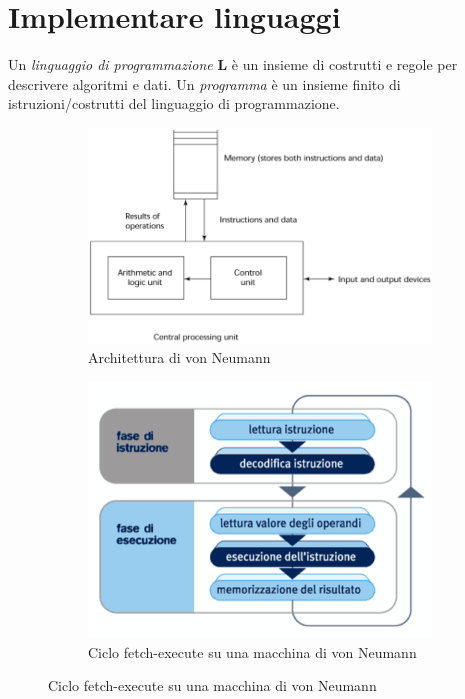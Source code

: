\documentclass[a4paper,oneside,titlepage]{book}
\begin{document}
\section{Implementare linguaggi}
Un \textit{linguaggio di programmazione} \textbf{L} è un insieme di costrutti e regole per descrivere algoritmi e dati. Un \textit{programma} è un insieme finito di istruzioni/costrutti del linguaggio di programmazione.
\begin{figure}[htp]
	\begin{subfigure}{0.49\textwidth}
		\includegraphics[width=\textwidth, height=\textheight, keepaspectratio]{vn1.png} 
		\caption{Architettura di von Neumann}
	\end{subfigure}
	\hfill
	\begin{subfigure}{0.49\textwidth}
		\includegraphics[width=\textwidth, height=\textheight, keepaspectratio]{vn2.png}
		\caption{Ciclo fetch-execute su una macchina di von Neumann}
	\end{subfigure}
\end{figure}
\end{document}
